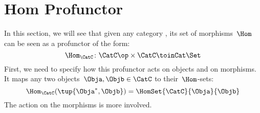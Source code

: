 \section{Hom Profunctor}
In this section, we will see that given any category \CatC, its set of morphisms~$\Hom$ can be seen as a profunctor of the form:
\begin{equation*}
    \Hom_\CatC\colon \CatC \op \times \CatC \toinCat \Set
\end{equation*}
First, we need to specify how this profunctor acts on objects and on morphisms.
It maps any two objects~$\Obja,\Objb\in \CatC$ to their~$\Hom$-sets:
\begin{equation*}
    \Hom_\CatC(\tup{\Obja^*,\Objb})=\HomSet{\CatC}{\Obja}{\Objb}
\end{equation*}
The action on the morphisms is more involved.

\devel{}


